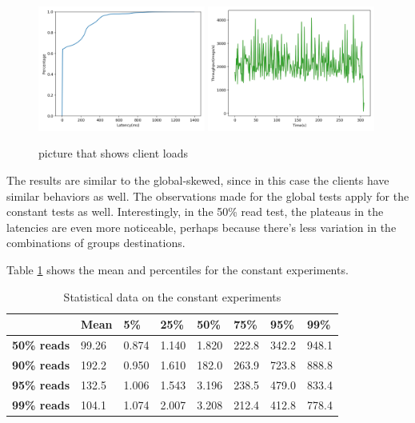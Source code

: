 \begin{figure}[!htb]
  \centering
  \includegraphics[width=0.49\textwidth,height=\textheight,keepaspectratio]{img/constant1_lat.png}
  \includegraphics[width=0.49\textwidth,height=\textheight,keepaspectratio]{img/constant1_tp.png}
  \caption{ picture that shows client loads }
  \label{fig:constant1-performance}
\end{figure}

The results are similar to the global-skewed, since in this case the clients have similar behaviors as well. The observations made for the global tests apply for the constant tests as well. Interestingly, in the 50\% read test, the plateaus in the latencies are even more noticeable, perhaps because there's less variation in the combinations of groups destinations.

Table \ref{tab:constant-latencies-table} shows the mean and percentiles for the constant experiments.

\begin{table}[!htb]
  \centering
  \begin{tabular}{l l l l l l l l}
    \hline
    & \textbf{Mean} & \textbf{5\%} & \textbf{25\%} & \textbf{50\%} & \textbf{75\%} & \textbf{95\%}& \textbf{99\%} \\
    \hline
    \textbf{50\% reads} & 99.26 & 0.874 & 1.140 & 1.820 & 222.8 & 342.2 & 948.1 \\
    \textbf{90\% reads} & 192.2 & 0.950 & 1.610 & 182.0 & 263.9 & 723.8 & 888.8 \\
    \textbf{95\% reads} & 132.5 & 1.006 & 1.543 & 3.196 & 238.5 & 479.0 & 833.4 \\
    \textbf{99\% reads} & 104.1 & 1.074 & 2.007 & 3.208 & 212.4 & 412.8 & 778.4 \\
    \hline
  \end{tabular}
  \caption{Statistical data on the constant experiments}\label{tab:constant-latencies-table}
\end{table}

